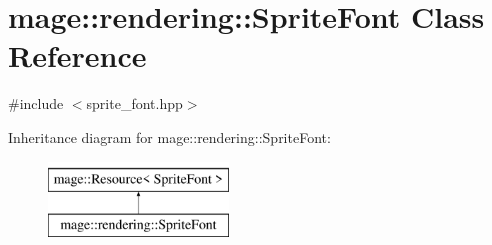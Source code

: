 \hypertarget{classmage_1_1rendering_1_1_sprite_font}{}\section{mage\+:\+:rendering\+:\+:Sprite\+Font Class Reference}
\label{classmage_1_1rendering_1_1_sprite_font}


{\ttfamily \#include $<$sprite\+\_\+font.\+hpp$>$}

Inheritance diagram for mage\+:\+:rendering\+:\+:Sprite\+Font\+:\begin{figure}[H]
\begin{center}
\leavevmode
\includegraphics[height=2.000000cm]{classmage_1_1rendering_1_1_sprite_font}
\end{center}
\end{figure}
